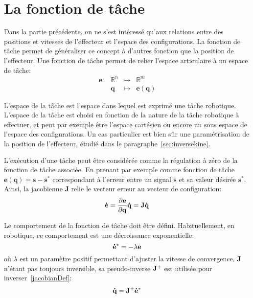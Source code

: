 \FloatBarrier
\section{La fonction de t\^ache}
Dans la partie précédente, on ne s'est intéressé qu'aux relations entre des
positions et vitesses de l'effecteur et l'espace des configurations.
La fonction de t\^ache permet de généraliser ce concept à d'autres fonction que la
position de l'effecteur.
Une fonction de t\^ache permet de relier l'espace articulaire
à un espace de t\^ache:
\begin{equation}
  \begin{array}{cccc}
  \mathbf{e} : &\mathbb{R}^n  &\rightarrow & \mathbb{R}^m
  \\ &\mathbf{q} &\mapsto &\mathbf{e}(\mathbf{q})
\end{array}
  \label{eq:fwdKine}
\end{equation}

L'espace de la t\^ache est l'espace dans lequel est exprimé une t\^ache robotique.
L'espace de la t\^ache est choisi en fonction de la
nature de la t\^ache robotique à effectuer, et peut par exemple être l'espace cartésien ou encore un sous espace 
de l'espace des configurations. Un cas particulier est bien sûr
une paramétrisation de la position de l'effecteur, étudié dans le paragraphe~\ref{sec:inversekine}.

L'exécution d'une t\^ache peut être considérée comme la régulation à zéro de la fonction de t\^ache associée.
En prenant par exemple comme fonction de t\^ache $\mathbf{e}(\mathbf{q}) = \mathbf{s} - \mathbf{s}^*$
correspondant à l'erreur entre un signal $\mathbf{s}$ et sa valeur désirée $\mathbf{s}^*$.
Ainsi, la jacobienne $\mathbf{J}$ relie le vecteur erreur au vecteur
de configuration:
\begin{equation}
  \mbf{\dot{e}} = \dpartial{\mbf{e}}{\mbf{q}} \mbf{\dot{q}} = \mbf{J} \mbf{\dot{q}}
  \label{jacobianDef}
\end{equation}

Le comportement de la fonction de t\^ache doit être défini. Habituellement,
en robotique, ce comportement est une décroissance exponentielle:
\begin{equation}
  \mbf{\dot{e}^*} = -\lambda \mbf{e}
  \label{expoDecrease}
\end{equation}
où $\lambda$ est un paramètre positif permettant d'ajuster la vitesse
de convergence.
${\mathbf{J}}$ n'étant pas toujours inversible, sa pseudo-inverse ${\mathbf{J}}^+$ est utilisée
pour inverser~\eqref{jacobianDef}:
\begin{equation}
  \mbf{\dot{q}} = \mbf{J}^+ \mbf{\dot{e}^*}
  \label{eq:invKine}
\end{equation}

